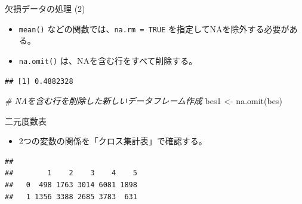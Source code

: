 \documentclass[
  ignorenonframetext,
]{beamer}
\newenvironment{Shaded}{\begin{snugshade}}{\end{snugshade}}
\newcommand{\AttributeTok}[1]{\textcolor[rgb]{0.77,0.63,0.00}{#1}}
\newcommand{\CommentTok}[1]{\textcolor[rgb]{0.56,0.35,0.01}{\textit{#1}}}
\newcommand{\ConstantTok}[1]{\textcolor[rgb]{0.00,0.00,0.00}{#1}}
\newcommand{\FunctionTok}[1]{\textcolor[rgb]{0.00,0.00,0.00}{#1}}
\newcommand{\NormalTok}[1]{#1}
\newcommand{\OtherTok}[1]{\textcolor[rgb]{0.56,0.35,0.01}{#1}}
\newcommand{\SpecialCharTok}[1]{\textcolor[rgb]{0.00,0.00,0.00}{#1}}
\providecommand{\tightlist}{%
  \setlength{\itemsep}{0pt}\setlength{\parskip}{0pt}}
\begin{document}
\begin{frame}[fragile]{欠損データの処理 (2)}
\protect\hypertarget{ux6b20ux640dux30c7ux30fcux30bfux306eux51e6ux7406-2}{}
\begin{itemize}
\tightlist
\item
  \texttt{mean()} などの関数では、\texttt{na.rm\ =\ TRUE}
  を指定してNAを除外する必要がある。
\item
  \texttt{na.omit()} は、NAを含む行をすべて削除する。
\end{itemize}

\begin{Shaded}
\end{Shaded}

\begin{verbatim}
## [1] 0.4882328
\end{verbatim}

\begin{Shaded}
\begin{Highlighting}[]
\CommentTok{\# NAを含む行を削除した新しいデータフレーム作成}
\NormalTok{bes1 }\OtherTok{\textless{}{-}} \FunctionTok{na.omit}\NormalTok{(bes)}
\end{Highlighting}
\end{Shaded}
\end{frame}

\begin{frame}[fragile]{二元度数表}
\protect\hypertarget{ux4e8cux5143ux5ea6ux6570ux8868}{}
\begin{itemize}
\tightlist
\item
  2つの変数の関係を「クロス集計表」で確認する。
\end{itemize}

\begin{Shaded}
\end{Shaded}

\begin{verbatim}
##    
##        1    2    3    4    5
##   0  498 1763 3014 6081 1898
##   1 1356 3388 2685 3783  631
\end{verbatim}
\end{frame}
\end{document}
